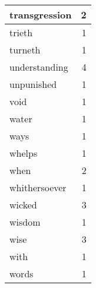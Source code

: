 \begin{center}
\begin{longtable}{l|r}
transgression & 2\\ \hline 
trieth & 1\\ \hline 
turneth & 1\\ \hline 
understanding & 4\\ \hline 
unpunished & 1\\ \hline 
void & 1\\ \hline 
water & 1\\ \hline 
ways & 1\\ \hline 
whelps & 1\\ \hline 
when & 2\\ \hline 
whithersoever & 1\\ \hline 
wicked & 3\\ \hline 
wisdom & 1\\ \hline 
wise & 3\\ \hline 
with & 1\\ \hline 
words & 1\\ \hline 
\end{longtable}  
\end{center}  


  
\normalsize  

  
  
